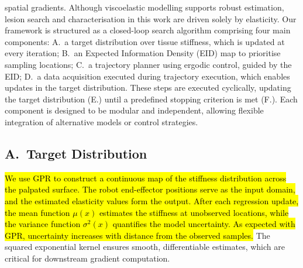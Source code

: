 \documentclass[11pt]{article}
\begin{document}
\newpage

\setcounter{equation}{0}

spatial gradients. Although viscoelastic modelling supports robust
estimation, lesion search and characterisation in this work are
driven solely by elasticity. Our framework is structured as a
closed-loop search algorithm comprising four main components:
A.~a target distribution over tissue stiffness, which is updated at
every iteration; B.~an Expected Information Density (EID) map to
prioritise sampling locations; C.~a trajectory planner using ergodic
control, guided by the EID; D.~a data acquisition executed during
trajectory execution, which enables updates in the target
distribution. These steps are executed cyclically, updating the
target distribution (E.) until a predefined stopping criterion is
met (F.). Each component is designed to be modular and independent,
allowing flexible integration of alternative models or control
strategies.

\subsection*{A.\ Target Distribution}

\hl{We use GPR to construct a continuous map of the stiffness
distribution across the palpated surface. The robot end-effector
positions serve as the input domain, and the estimated elasticity
values form the output. After each regression update, the mean
function $\mu(x)$ estimates the stiffness at unobserved locations,
while the variance function $\sigma^{2}(x)$ quantifies the model
uncertainty. As expected with GPR, uncertainty increases with
distance from the observed samples.} The squared exponential kernel
ensures smooth, differentiable estimates, which are critical for
downstream gradient computation.
\end{document}
